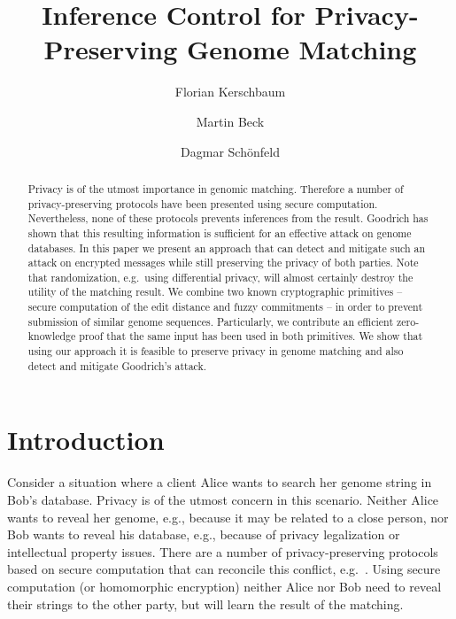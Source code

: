 \documentclass{llncs}
\begin{document}
\title{Inference Control for Privacy-Preserving Genome Matching}

\author{Florian Kerschbaum \and
        Martin Beck \and
        Dagmar Sch\"onfeld}




\maketitle

\begin{abstract}
Privacy is of the utmost importance in genomic matching.
Therefore a number of privacy-preserving protocols have been presented using secure computation.
Nevertheless, none of these protocols prevents inferences from the result.
Goodrich has shown that this resulting information is sufficient for an effective attack on genome databases.
In this paper we present an approach that can detect and mitigate such an attack on encrypted messages while still preserving the privacy of both parties.
Note that randomization, e.g.~using differential privacy, will almost certainly destroy the utility of the matching result.
We combine two known cryptographic primitives -- secure computation of the edit distance and fuzzy commitments -- in order to prevent submission of similar genome sequences.
Particularly, we contribute an efficient zero-knowledge proof that the same input has been used in both primitives.
We show that using our approach it is feasible to preserve privacy in genome matching and also detect and mitigate Goodrich's attack.
\end{abstract}









\section{Introduction}
\label{sec:intro}

Consider a situation where a client Alice wants to search her genome string in Bob's database.
Privacy is of the utmost concern in this scenario.
Neither Alice wants to reveal her genome, e.g., because it may be related to a close person, nor Bob wants to reveal his database, e.g., because of privacy legalization or intellectual property issues.
There are a number of privacy-preserving protocols based on secure computation that can reconcile this conflict, e.g.~\cite{AtaKer03,BecKer12,JhaKru08,TroKat07}.
Using secure computation (or homomorphic encryption) neither Alice nor Bob need to reveal their strings to the other party, but will learn the result of the matching.
\end{document}
